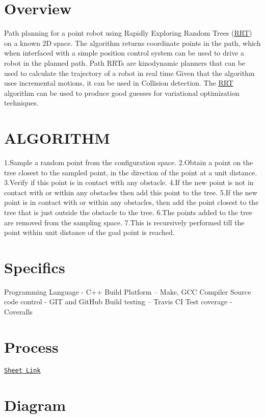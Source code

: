\hypertarget{index_Overview}{}\section{Overview}\label{index_Overview}
Path planning for a point robot using Rapidly Exploring Random Trees (\hyperlink{classRRT}{R\+RT}) on a known 2D space. The algorithm returns coordinate points in the path, which when interfaced with a simple position control system can be used to drive a robot in the planned path. Path R\+R\+Ts are kinodynamic planners that can be used to calculate the trajectory of a robot in real time Given that the algorithm uses incremental motions, it can be used in Collision detection. The \hyperlink{classRRT}{R\+RT} algorithm can be used to produce good guesses for variational optimization techniques.\hypertarget{index_RRT}{}\section{A\+L\+G\+O\+R\+I\+T\+HM}\label{index_RRT}
1.\+Sample a random point from the configuration space. 2.\+Obtain a point on the tree closest to the sampled point, in the direction of the point at a unit distance. 3.\+Verify if this point is in contact with any obstacle. 4.\+If the new point is not in contact with or within any obstacles then add this point to the tree. 5.\+If the new point is in contact with or within any obstacles, then add the point closest to the tree that is just outside the obstacle to the tree. 6.\+The points added to the tree are removed from the sampling space. 7.\+This is recursively performed till the point within unit distance of the goal point is reached.\hypertarget{index_Project}{}\section{Specifics}\label{index_Project}
Programming Language -\/ C++ Build Platform – Make, G\+CC Compiler Source code control -\/ G\+IT and Git\+Hub Build testing – Travis CI Test coverage -\/ Coveralls\hypertarget{index_Agile}{}\section{Process}\label{index_Agile}
\href{https://docs.google.com/spreadsheets/d/1cJVLNv9pZ2T4a17OsMPn_WnxRS6tAkfYJKaMcSRo6MA/edit?usp=sharing}{\tt Sheet Link}\hypertarget{index_Class}{}\section{Diagram}\label{index_Class}
 